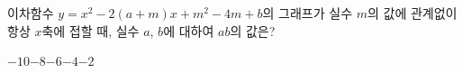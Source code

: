 이차함수 $y=x^2-2(a+m)x+m^2-4m+b$의 그래프가 실수 $m$의 값에 관계없이 항상 $x$축에 접할 때, 실수 $a$, $b$에 대하여 $ab$의 값은?
\begin{choices32}{$-10$}{$-8$}{$-6$}{$-4$}{$-2$}\end{choices32}
